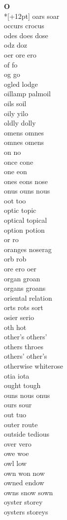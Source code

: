 \vspace{14pt}
\noindent\textbf{\Large O}\\*[+12pt]
oars soar\\
occurs crocus\\
odes does dose\\
odz doz\\
oer ore ero\\
of fo\\
og go\\
ogled lodge\\
oillamp palmoil\\
oils soil\\
oily yilo\\
oldly dolly\\
omens omnes\\
omnes omens\\
on no\\
once cone\\
one eon\\
ones eons nose\\
onus ouns nous\\
oot too\\
optic topic\\
optical topical\\
option potion\\
or ro\\
oranges noserag\\
orb rob\\
ore ero oer\\
organ groan\\
organs groans\\
oriental relation\\
orts rots sort\\
osier serio\\
oth hot\\
other's others'\\
others throes\\
others' other's\\
otherwise whiterose\\
otia iota\\
ought tough\\
ouns nous onus\\
ours sour\\
out tuo\\
outer route\\
outside tedious\\
over vero\\
owe woe\\
owl low\\
own won now\\
owned endow\\
owns snow sown\\
oyster storey\\
oysters storeys\\

